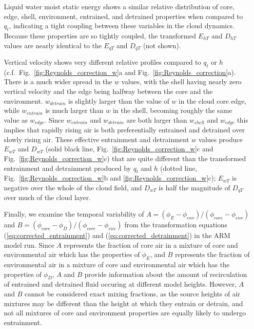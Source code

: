 \documentclass[12pt]{article}
\begin{document}
Liquid water moist static energy shows a similar relative distribution of 
core, edge, shell, environment, entrained, and detrained properties when 
compared to $q_t$, indicating a tight coupling between these variables in 
the cloud dynamics.  Because these properties are so tightly coupled, the
transformed $E_{hT}$ and $D_{hT}$ values are nearly identical to the $E_{qT}$ 
and $D_{qT}$ (not shown).

Vertical velocity shows very different relative profiles compared to
$q_t$ or $h$ (c.f.~Fig.~\ref{fig:Reynolds_correction_w}a and 
Fig.~\ref{fig:Reynolds_correction}a).  There is a
much wider spread in the $w$ values, with the shell having nearly zero
vertical velocity and the edge being halfway between the core and the
environment.  $w_{detrain}$ is slightly larger than the value of $w$
in the cloud core edge, while $w_{entrain}$ is much larger than $w$ in
the shell, becoming roughly the same value as $w_{edge}$.  Since
$w_{entrain}$ and $w_{detrain}$ are both larger than $w_{shell}$ and
$w_{edge}$ this implies that rapidly rising air is both preferentially
entrained and detrained over slowly rising air.  These effective
entrainment and detrainment $w$ values produce $E_{wT}$ and $D_{wT}$
(solid black line, Fig.~\ref{fig:Reynolds_correction_w}c and 
Fig.~\ref{fig:Reynolds_correction_w}c) that are quite different than the 
transformed entrainment and detrainment produced by $q_t$ and $h$
(dotted line, Fig.~\ref{fig:Reynolds_correction_w}b and 
\ref{fig:Reynolds_correction_w}c); $E_{wT}$ is negative
over the whole of the cloud field, and $D_{wT}$ is half the magnitude
of $D_{qT}$ over much of the cloud layer.

Finally, we examine the temporal variability of 
$A = (\phi_E - \phi_{env})/(\phi_{core} - \phi_{env})$ and
$B = (\phi_{core} - \phi_D)/(\phi_{core} - \phi_{env})$ from the transformation
equations (\ref{eq:corrected_entrainment}) and (\ref{eq:corrected_detrainment})
in the ARM model run.  Since $A$ represents the fraction of core air in a 
mixture of core and environmental air which has the properties of $\phi_E$, and
$B$ represents the fraction of environmental air in a mixture of core and 
environmental air which has the properties of $\phi_D$, $A$ and $B$ provide 
information about the amount of recirculation of entrained and detrained fluid 
occuring at different model heights.  However, $A$ and $B$ cannot be considered 
exact mixing fractions, as the source heights of air mixtures may be different 
than the height at which they entrain or detrain, and not all mixtures of 
core and environment properties are equally likely to undergo entrainment.
\end{document}
